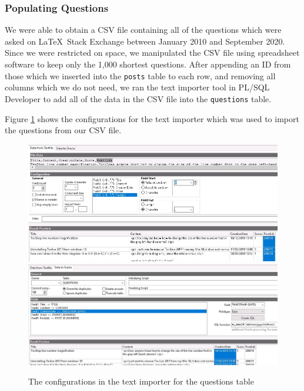 
\subsubsection{Populating Questions}

We were able to obtain a CSV file containing all of the questions which were asked on \LaTeX\ Stack Exchange between January 2010 and September 2020. Since we were restricted on space, we manipulated the CSV file using spreadsheet software to keep only the 1,000 shortest questions. After appending an ID from those which we inserted into the \verb`posts` table to each row, and removing all columns which we do not need, we ran the text importer tool in PL/SQL Developer to add all of the data in the CSV file into the \verb`questions` table.

Figure \ref{questions-text-import} shows the configurations for the text importer which was used to import the questions from our CSV file.

\begin{figure}[htbp]
	\centering
	\includegraphics[width=\linewidth]{images/questions_text_import_1.jpeg}
	\vspace{2em}
	\includegraphics[width=\linewidth]{images/questions_text_import_2.jpeg}
	\caption{The configurations in the text importer for the questions table}
	\label{questions-text-import}
\end{figure}

